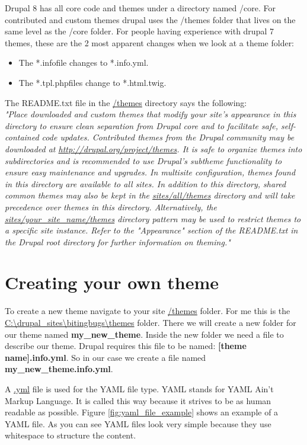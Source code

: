Drupal 8 has all core code and themes under a directory named /core. For contributed and custom themes drupal uses the /themes folder that lives on the same level as the /core folder. For people having experience with drupal 7 themes, these are the 2 most apparent changes when we look at a theme folder:
\begin{itemize}
	\item The *.infofile changes to *.info.yml.
	\item The *.tpl.phpfiles change to *.html.twig.
\end{itemize}

The README.txt file in the \url{/themes} directory says the following:\\

\textit{"Place downloaded and custom themes that modify your site's appearance in this directory to ensure clean separation from Drupal core and to facilitate safe, self-contained code updates. Contributed themes from the Drupal community may be downloaded at \url{http://drupal.org/project/themes}.	It is safe to organize themes into subdirectories and is recommended to use	Drupal's sub­theme functionality to ensure easy maintenance and upgrades. In multisite configuration, themes found in this directory are available to all sites. In addition to this directory, shared common themes may also be kept in the \url{sites/all/themes} directory and will take precedence over themes in this directory. Alternatively, the \url{sites/your_site_name/themes} directory pattern may be used to restrict themes to a specific site instance. Refer to the "Appearance" section of the README.txt in the Drupal root directory for further information on theming."
}


\section{Creating your own theme}

To create a new theme navigate to your site \url{/themes} folder. For me this is the \url{C:\drupal_sites\bitingbugs\themes} folder. There we will create a new folder for our theme named \textbf{my\_new\_theme}. Inside the new folder we need a file to describe our theme. Drupal requires this file to be named: \textbf{[theme name].info.yml}. So in our case we create a file named \textbf{my\_new\_theme.info.yml}.

A \url{.yml} file is used for the YAML file type. YAML stands for YAML Ain't Markup Language. It is called this way because it strives to be as human readable as possible. Figure \ref{fig:yaml_file_example} shows an example of a YAML file. As you can see YAML files look very simple because they use whitespace to structure the content. 

